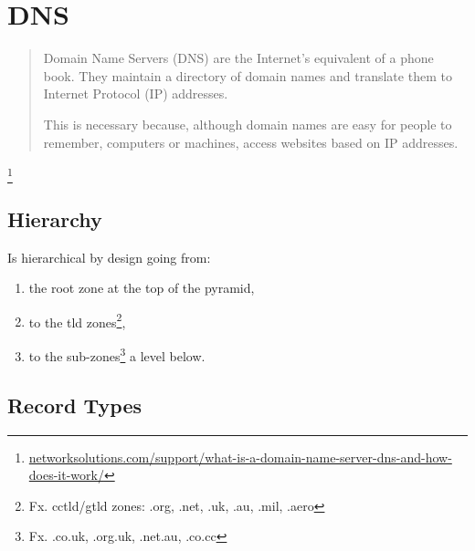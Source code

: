 \chapter{DNS}

\begin{quote}
    Domain Name Servers (DNS) are the Internet's equivalent of a phone book. They maintain a directory of domain names and translate them to Internet Protocol (IP) addresses.
    
    This is necessary because, although domain names are easy for people to remember, computers or machines, access websites based on IP addresses. 
\end{quote}\footnote{\href{http://www.networksolutions.com/support/what-is-a-domain-name-server-dns-and-how-does-it-work/}{networksolutions.com/support/what-is-a-domain-name-server-dns-and-how-does-it-work/}}

\pagebreak

\section{Hierarchy}


\pagebreak

Is hierarchical by design going from:

\begin{enumerate}
    \item the root zone at the top of the pyramid,
    \item to the \gls{tld} zones\footnote{Fx. \gls{cctld}/\gls{gtld} zones: .org, .net, .uk, .au, .mil, .aero},
    \item to the sub-zones\footnote{Fx. .co.uk, .org.uk, .net.au, .co.cc} a level below.
\end{enumerate}


\pagebreak

\section{Record Types}

